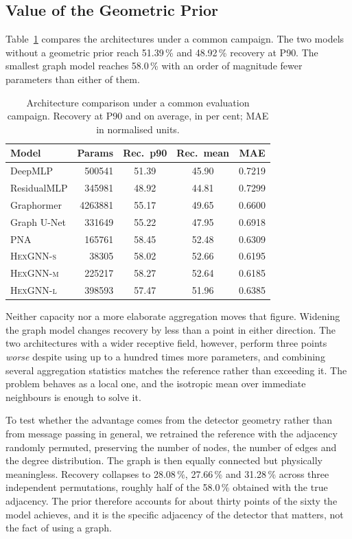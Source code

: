 \documentclass[10pt,conference]{IEEEtran}
\begin{document}
\subsection{Value of the Geometric Prior}
\label{sec:res-prior}

Table~\ref{tab:architectures} compares the architectures under a common
campaign. The two models without a geometric prior reach 51.39\,\% and
48.92\,\% recovery at P90. The smallest graph model reaches
58.0\,\% with an order of magnitude fewer parameters than either of them.

\begin{table}[t]
\centering
\caption{Architecture comparison under a common evaluation campaign. Recovery
at P90 and on average, in per cent; MAE in normalised units.}
\label{tab:architectures}
\begin{tabular}{@{}lrccc@{}}
\toprule
\textbf{Model} & \textbf{Params} & \textbf{Rec.\ p90} & \textbf{Rec.\ mean} & \textbf{MAE} \\
\midrule
DeepMLP           & \num{500541}  & 51.39 & 45.90 & 0.7219 \\
ResidualMLP       & \num{345981}  & 48.92 & 44.81 & 0.7299 \\
Graphormer        & \num{4263881} & 55.17 & 49.65 & 0.6600 \\
Graph U-Net       & \num{331649}  & 55.22 & 47.95 & 0.6918 \\
PNA               & \num{165761}  & 58.45 & 52.48 & 0.6309 \\
\textsc{HexGNN-s} & \num{38305}   & 58.02 & 52.66 & 0.6195 \\
\textsc{HexGNN-m} & \num{225217}  & 58.27 & 52.64 & 0.6185 \\
\textsc{HexGNN-l} & \num{398593}  & 57.47 & 51.96 & 0.6385 \\
\bottomrule
\end{tabular}
\end{table}

Neither capacity nor a more elaborate aggregation moves that figure. Widening
the graph model changes recovery by less than a point in either direction. The
two architectures with a wider receptive field, however, perform three points
\emph{worse} despite using up to a hundred times more parameters, and combining
several aggregation statistics matches the reference rather than exceeding it. The problem behaves as a local
one, and the isotropic mean over immediate neighbours is enough to solve it.

To test whether the advantage comes from the detector geometry rather than from
message passing in general, we retrained the reference with the adjacency
randomly permuted, preserving the number of nodes, the number of edges and the
degree distribution. The graph is then equally connected but physically
meaningless. Recovery collapses to 28.08\,\%, 27.66\,\% and 31.28\,\% across three
independent permutations, roughly half of the 58.0\,\% obtained with the true
adjacency. The prior therefore accounts for about thirty points of the sixty
the model achieves, and it is the specific adjacency of the detector that
matters, not the fact of using a graph.
\end{document}

